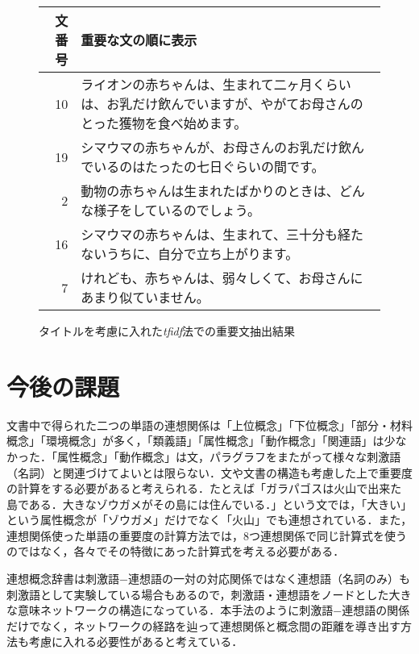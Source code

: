 \begin{figure}[htb]

\begin{small}
\begin{tabular}{|r|p{350pt}|} \hline
文番号&	重要な文の順に表示\\ \hline
	10& 	ライオンの赤ちゃんは、生まれて二ヶ月くらいは、お乳だけ飲んでいますが、やがてお母さんのとった獲物を食べ始めます。\\
	19& 	シマウマの赤ちゃんが、お母さんのお乳だけ飲んでいるのはたったの七日ぐらいの間です。\\
	2& 	動物の赤ちゃんは生まれたばかりのときは、どんな様子をしているのでしょう。 \\
	16& 	シマウマの赤ちゃんは、生まれて、三十分も経たないうちに、自分で立ち上がります。\\
	7&	けれども、赤ちゃんは、弱々しくて、お母さんにあまり似ていません。\\ \hline
\end{tabular}
\end{small}

\caption{タイトルを考慮に入れた{\it tfidf}法での重要文抽出結果}\label{tfidf+a}

\end{figure}


\section{今後の課題}

文書中で得られた二つの単語の連想関係は「上位概念」「下位概念」「部分・材料概念」「環境概念」が多く，「類義語」「属性概念」「動作概念」「関連語」は少なかった．「属性概念」「動作概念」は文，パラグラフをまたがって様々な刺激語（名詞）と関連づけてよいとは限らない．文や文書の構造も考慮した上で重要度の計算をする必要があると考えられる．たとえば「ガラパゴスは火山で出来た島である．大きなゾウガメがその島には住んでいる．」という文では，「大きい」という属性概念が「ゾウガメ」だけでなく「火山」でも連想されている．また，連想関係使った単語の重要度の計算方法では，8つ連想関係で同じ計算式を使うのではなく，各々でその特徴にあった計算式を考える必要がある．

連想概念辞書は刺激語−連想語の一対の対応関係ではなく連想語（名詞のみ）も刺激語として実験している場合もあるので，刺激語・連想語をノードとした大きな意味ネットワークの構造になっている\cite{Okamoto2001}．本手法のように刺激語−連想語の関係だけでなく，ネットワークの経路を辿って連想関係と概念間の距離を導き出す方法も考慮に入れる必要性があると考えている．

